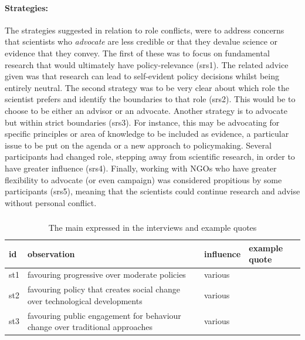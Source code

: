 \paragraph{Strategies:}
The strategies suggested in relation to role conflicts, were to address concerns that scientists who \emph{advocate} are less credible or that they devalue science or evidence that they convey. The first of these was to focus on fundamental research that would ultimately have policy-relevance (srs1). The related advice given was that research can lead to self-evident policy decisions whilst being entirely neutral. The second strategy was to be very clear about which role the scientist prefers and identify the boundaries to that role (srs2). This would be to choose to be either an advisor or an advocate. Another strategy is to advocate but within strict boundaries (srs3). For instance, this may be advocating for specific principles or area of knowledge to be included as evidence, a particular issue to be put on the agenda or a new approach to policymaking. Several participants had changed role, stepping away from scientific research, in order to have greater influence (srs4). Finally, working with NGOs who have greater flexibility to advocate (or even campaign) was considered propitious by some participants (srs5), meaning that the scientists could continue research and advise without personal conflict.

\subsubsection{\ismst}\label{sec:restastes}

\begin{table}[!ht]
\footnotesize
\caption{The main \ismst{} expressed in the interviews and example quotes}\label{tab:restastes}
\begin{tabular}{L{.06\linewidth}L{.3\linewidth}L{.12\linewidth}L{.52\linewidth}} \hline
\textbf{id} & \textbf{observation} & \textbf{influence} & \textbf{example quote} \\ \hline \hline
st1 & favouring progressive over moderate policies & various &  \\[5mm]
st2 & favouring policy that creates social change over technological developments & various &  \\[5mm]
st3 & favouring public engagement for behaviour change over traditional approaches & various &  \\[5mm]
 \hline
\end{tabular}
\end{table}


